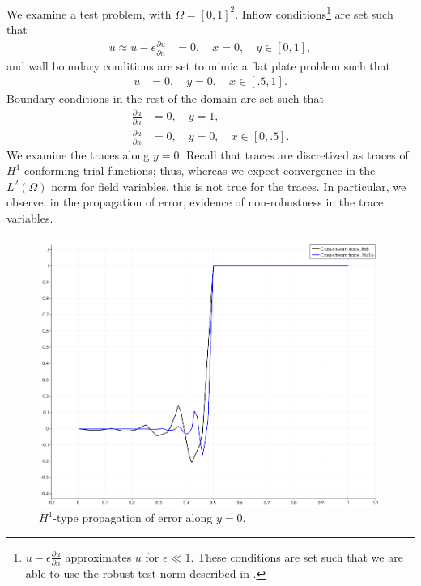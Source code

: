 \documentclass[11pt,onecolumn]{scrartcl}
\newcommand{\LRp}[1]{\left( #1 \right)}
\renewcommand{\L}{L^2\LRp{\Omega}}
\newcommand{\pd}[2]{\frac{\partial#1}{\partial#2}}
\begin{document}
We examine a test problem, with $\Omega = [0,1]^2$.  Inflow conditions\footnote{$u-\epsilon\pd{u}{n}$ approximates $u$ for $\epsilon\ll 1$.  These conditions are set such that we are able to use the robust test norm described in \cite{ChanHeuerBui-ThanhDemkowicz12}.} are set such that
\begin{align*}
u \approx u-\epsilon\pd{u}{n} &= 0,\quad x = 0,\quad y \in [0,1],
\end{align*}
and wall boundary conditions are set to mimic a flat plate problem such that
\begin{align*}
u &= 0,\quad y = 0,\quad x \in [.5,1].
\end{align*}
Boundary conditions in the rest of the domain are set such that
\begin{align*}
\pd{u}{n} &= 0,\quad y = 1,\\
\pd{u}{n} &= 0,\quad y = 0,\quad x \in [0,.5].
\end{align*}
We examine the traces along $y=0$.  Recall that traces are discretized as traces of $H^1$-conforming trial functions; thus, whereas we expect convergence in the $\L$ norm for field variables, this is not true for the traces.  In particular, we observe, in the propagation of error, evidence of non-robustness in the trace variables.  
\begin{figure}
\centering
\includegraphics[scale=.4]{figs/CrossTraces.png}
\caption{$H^1$-type propagation of error along $y = 0$.}
\end{figure}
\end{document}
